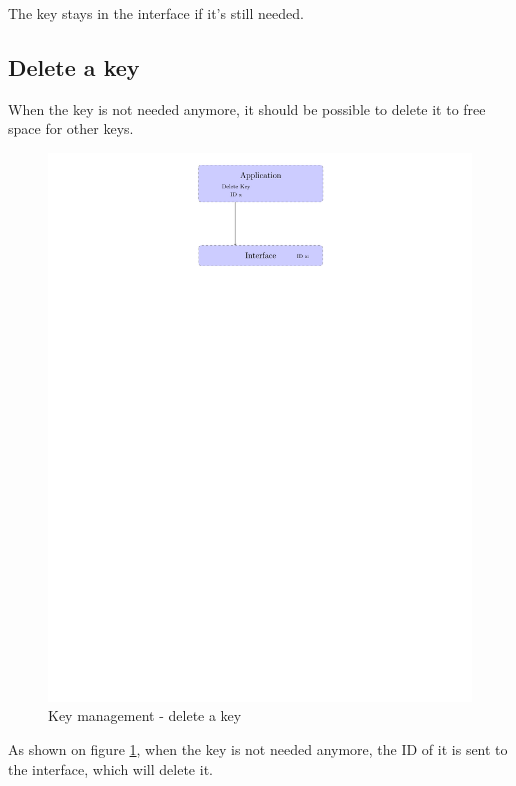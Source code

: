 The key stays in the interface if it's still needed.

\subsection*{Delete a key}
When the key is not needed anymore, it should be possible to delete it to free
space for other keys.

\begin{figure}[!ht]
\centering
\includegraphics[trim=12cm 22cm 9.5cm 0cm]{figures/key_manag_del_key.pdf}
\caption{Key management - delete a key\newline}
\label{fig:gci_key_mng_del}
\end{figure}

As shown on figure \ref{fig:gci_key_mng_del}, when the key is not needed
anymore, the ID of it is sent to the interface, which will delete it.
